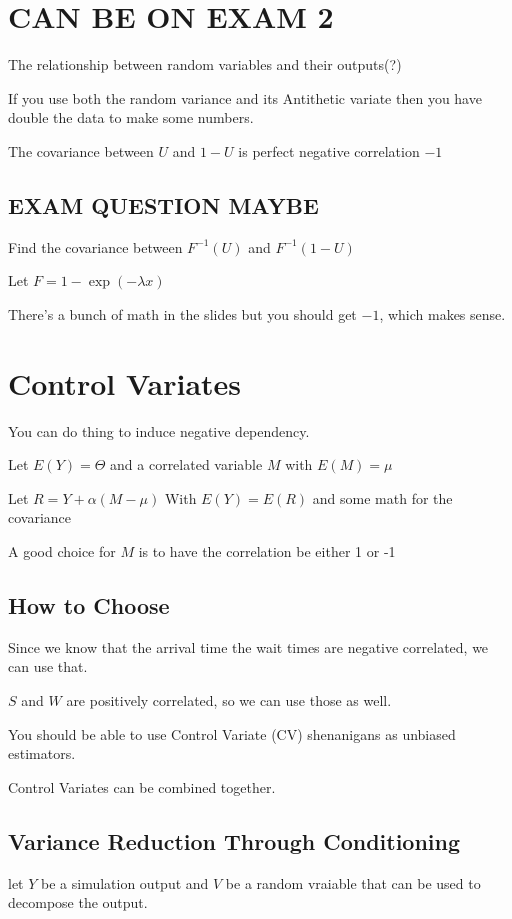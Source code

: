 \documentclass[fleqn]{report}
\begin{document}
\section{CAN BE ON EXAM 2}
The relationship between random variables and their outputs(?)

If you use both the random variance and its Antithetic variate then 
you have double the data to make some numbers. 

The covariance between $U$ and $1-U$ is perfect negative correlation 
$-1$

\subsection{EXAM QUESTION MAYBE}
Find the covariance between $F^{-1}(U)$ and $F^{-1}(1 - U)$ 

Let $F = 1 - \exp(-\lambda x)$

There's a bunch of math in the slides but you should get $-1$, which makes sense. 

\section{Control Variates}
You can do thing to induce negative dependency. 

Let $E(Y) = \Theta$ and a correlated variable $M$ with $E(M) = \mu$

Let $R = Y + \alpha (M - \mu)$ 
With $E(Y) = E(R)$ and some math for the covariance 

A good choice for $M$ is to have the correlation be either 1 or -1 

\subsection{How to Choose}
Since we know that the arrival time the wait times are negative correlated, we 
can use that. 

$S$ and $W$ are positively correlated, so we can use those as well. 

You should be able to use Control Variate (CV) shenanigans as 
unbiased estimators. 

Control Variates can be combined together. 

\subsection{Variance Reduction Through Conditioning}
let $Y$ be a simulation output and $V$ be a random vraiable that 
can be used to decompose the output.
\end{document}
